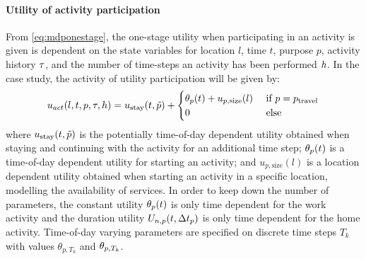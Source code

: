 \paragraph{Utility of activity participation}
From \eqref{eq:mdponestage}, the one-stage utility when participating in an activity is given is dependent on the state variables for location $l$, time $t$, purpose $p$, activity history $\tau$, and the number of time-steps an activity has been performed $h$. In the case study, the activity of utility participation will be given by:
\begin{equation}
	\avgu_{act}(l,t,p,\atime,\amem) = u_\text{stay}(t,\act{p}) + \begin{cases} 
	\ac_p(t) + u_{p,\text{size}}(l) &\cif p = p_{\text{travel}} \\
	0 & \celse
	\end{cases}
\end{equation}
where $u_\text{stay}(t,\tilde{p})$ is the potentially time-of-day dependent utility obtained when staying and continuing with the activity for an additional time step; $\theta_p(t)$ is a time-of-day dependent utility for starting an activity; and $u_{p,\text{size}}(l)$ is a location dependent utility obtained when starting an activity in a specific location, modelling the availability of services. In order to keep down the number of parameters, the constant utility $\theta_p(t)$ is only time dependent for the work activity and the duration utility $U_{n,p}(t,\Delta t_p)$ is only time dependent for the home activity. Time-of-day varying parameters are specified on discrete time steps $T_k$ with values $\theta_{p,T_k}$ and $\theta_{p,T_k}$. 

